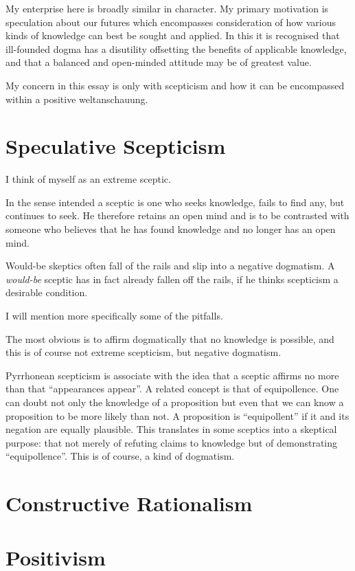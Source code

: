 \documentclass{rbjk}
\begin{document}
\begin{article}
My enterprise here is broadly similar in character.
My primary motivation is speculation about our futures which encompasses consideration of how various kinds of knowledge can best be sought and applied.
In this it is recognised that ill-founded dogma has a disutility offsetting the benefits of applicable knowledge, and that a balanced and open-minded attitude may be of greatest value.

My concern in this essay is only with scepticism and how it can be encompassed within a positive weltanschauung.

\section{Speculative Scepticism}

I think of myself as an extreme sceptic.

In the sense intended a sceptic is one who seeks knowledge, fails to find any, but continues to seek.
He therefore retains an open mind and is to be contrasted with someone who believes that he has found knowledge and no longer has an open mind.

Would-be skeptics often fall of the rails and slip into a negative dogmatism.
A {\it would-be} sceptic has in fact already fallen off the rails, if he thinks scepticism a desirable condition.

I will mention more specifically some of the pitfalls.

The most obvious is to affirm dogmatically that no knowledge is possible, and this is of course not extreme scepticism, but negative dogmatism.

Pyrrhonean scepticism is associate with the idea that a sceptic affirms no more than that ``appearances appear''.
A related concept is that of equipollence.
One can doubt not only the knowledge of a proposition but even that we can know a proposition to be more likely than not.
A proposition is ``equipollent'' if it and its negation are equally plausible.
This translates in some sceptics into a skeptical purpose: that not merely of refuting claims to knowledge but of demonstrating ``equipollence''.
This is of course, a kind of dogmatism.

\section{Constructive Rationalism}

\section{Positivism}


\end{article}
\end{document}
